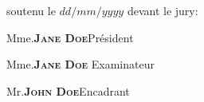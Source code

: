 \begin{titlepage}
soutenu le $dd/mm/yyyy$ devant le jury: 

\begin{center}

\vspace{0.5cm}

Mme.\textbf{\textsc{Jane Doe}}\hfill Président


Mme.\textbf{\textsc{Jane Doe}} \hfill Examinateur

Mr.\textbf{\textsc{John Doe}}\hfill Encadrant


\end{center}

\end{titlepage}

\restoregeometry
